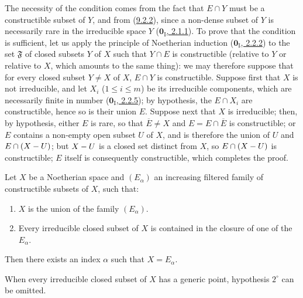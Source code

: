 The necessity of the condition comes from the fact that $E\cap Y$ must be a
constructible subset of $Y$, and from (\hyperref[0.9.2.2]{9.2.2}), since a
non-dense subset of $Y$ is necessarily rare in the irreducible space
$Y$ (\hyperref[0.2.1.1]{$\mathbf{0}_{\mathrm I}$, 2.1.1}). To prove that the
condition is sufficient, let us apply the principle of Noetherian induction
(\hyperref[0.2.2.2]{$\mathbf{0}_{\mathrm I}$, 2.2.2}) to the set
$\mathfrak{F}$ of closed subsets $Y$ of $X$ such that $Y\cap E$ is
constructible (relative to $Y$ or relative to $X$, which amounts to the
same thing): we may therefore suppose that for every closed subset $Y\ne X$
of $X$, $E\cap Y$ is constructible. Suppose first that $X$ is not
irreducible, and let $X_i$ ($1\leq i\leq m$) be its irreducible
components, which are necessarily finite in number
(\hyperref[0.2.2.5]{$\mathbf{0}_{\mathrm I}$, 2.2.5}); by hypothesis, the
$E\cap X_i$ are constructible, hence so is their union $E$. Suppose
next that $X$ is irreducible; then, by hypothesis, either $E$ is
rare, so that $\overline{E}\ne X$ and $E=E\cap\overline{E}$ is constructible;
or $E$ contains a non-empty open subset $U$ of $X$, and is therefore the union
of $U$ and $E\cap(X- U)$; but $X- U$ is a closed set
distinct from $X$, so $E\cap(X- U)$ is constructible; $E$
itself is consequently constructible, which completes the proof.

\begin{corollary}[9.2.4]
\label{0.9.2.4}
Let $X$ be a Noetherian space and $(E_\alpha)$ an increasing filtered
family of constructible subsets of $X$, such that:
\begin{enumerate}
  \item[$1^\circ$] $X$ is the union of the family $(E_\alpha)$.
  \item[$2^\circ$] Every irreducible closed subset of $X$ is contained in
    the closure of one of the $E_\alpha$.
\end{enumerate}
Then there exists an index $\alpha$ such that $X=E_\alpha$.

When every irreducible closed subset of $X$ has a generic point,
hypothesis $2^\circ$ can be omitted.
\end{corollary}

